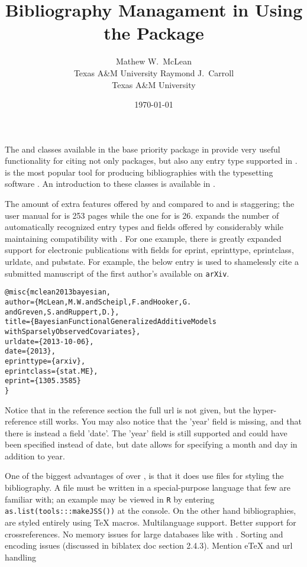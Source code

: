 \documentclass[article]{jss}\usepackage[]{graphicx}\usepackage[]{color}
\title{\Biblatex{} Bibliography Managament in \R{} Using the \ourpkg{} Package}
\author{Mathew W.\ McLean\\ Texas A\&M University
\And
Raymond J.\ Carroll\\
Texas A\&M University
}
\date{\today}
\makeatletter
\newenvironment{kframe}{%
 \def\at@end@of@kframe{}%
 \ifinner\ifhmode%
  \def\at@end@of@kframe{\end{minipage}}%
  \begin{minipage}{\columnwidth}%
 \fi\fi%
 \def\FrameCommand##1{\hskip\@totalleftmargin \hskip-\fboxsep
 \colorbox{shadecolor}{##1}\hskip-\fboxsep
     \hskip-\linewidth \hskip-\@totalleftmargin \hskip\columnwidth}%
 \MakeFramed {\advance\hsize-\width
   \@totalleftmargin\z@ \linewidth\hsize
   \@setminipage}}%
 {\par\unskip\endMakeFramed%
 \at@end@of@kframe}
\newenvironment{knitrout}{}{} %
\makeatother
\begin{document}
\maketitle

The  and  classes available in the base priority  package in \R{} provide very useful functionality for citing not only \R{} packages, but also any entry type supported in \Bibtex.  \Bibtex{} \citep{bibtex} is the most popular tool for producing bibliographies with the typesetting software \proglang{\TeX}.  An introduction to these classes is available in \citet{hornik2012who}.

The amount of extra features offered by \Biblatex{} and \biber{} compared to \natbib{} and \Bibtex{} is staggering; the user manual for \Biblatex{} is 253 pages while the one for \natbib{} is 26.  \Biblatex{} expands the number of automatically recognized entry types and fields offered by \Bibtex{} considerably while maintaining compatibility with \Bibtex{}.  For one example, there is greatly expanded support for electronic publications with fields for eprint, eprinttype, eprintclass, urldate, and pubstate.  For example, the below entry is used to shamelessly cite a submitted manuscript of the first author's available on \texttt{arXiv}. 

\begin{knitrout}
\color{fgcolor}\begin{kframe}
\begin{alltt}
@misc\{mclean2013bayesian,
  author = \{McLean, M. W. and Scheipl, F. and Hooker, G.
                and Greven, S. and Ruppert, D.\},
  title = \{Bayesian Functional Generalized Additive Models 
                with Sparsely Observed Covariates\},
  urldate = \{2013-10-06\},
  date = \{2013\},
  eprinttype = \{arxiv\},
  eprintclass = \{stat.ME\},
  eprint = \{1305.3585\}
\}
\end{alltt}
\end{kframe}
\end{knitrout}

Notice that in the reference section the full url is not given, but the hyper-reference still works.  You may also notice that the 'year' field is missing, and that there is instead a field 'date'.  The 'year' field is still supported and could have been specified instead of date, but date allows for specifying a month and day in addition to year.

One of the biggest advantages of \Biblatex{} over \Bibtex{}, is that it does use \bst{} files for styling the bibliography. A \bst{} file must be written in a special-purpose language that few are familiar with; an example may be viewed in \texttt{R} by entering \texttt{as.list(tools:::makeJSS())} at the console.  On the other hand \Biblatex{} bibliographies, are styled entirely using \TeX{} macros.  Multilanguage support.  Better support for crossreferences.  No memory issues for large databases like with \Bibtex{}.  Sorting and encoding issues (discussed in biblatex doc section 2.4.3). Mention eTeX and url handling
\end{document}
